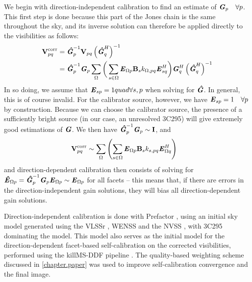 \pg
We begin with direction-independent calibration to find an estimate of $\textbf{\emph{G}}_p\quad\forall p$. This first step is done because this part of the Jones chain is the same throughout the sky, and its inverse solution can therefore be applied directly to the visibilities as follows:
\begin{align}
\textbf{V}_{pq}^\mathrm{corr} &= \textbf{\emph{\^{G}}}_p^{-1} \textbf{V}_{pq} \left( \textbf{\emph{\^{G}}}_q^H \right)^{-1}\\
						&= \textbf{\emph{\^{G}}}_p^{-1}\textbf{\emph{G}}_p \sum_{\Omega}\bigg( \sum_{s\in\Omega} \textbf{\emph{E}}_{\Omega p} \textbf{B}_{s} k_{\Omega,pq} \textbf{\emph{E}}_{sq}^H \bigg) \textbf{\emph{G}}_q^H \left( \textbf{\emph{\^{G}}}_q^H \right)^{-1}
\end{align}
In so doing, we assume that $\textbf{\emph{E}}_{sp}=1quad \forall s,p$ when solving for $\textbf{\emph{\^{G}}}$. In general, this is of course invalid. For the calibrator source, however, we have $\textbf{\emph{E}}_{sp} =1 \quad\forall p$ by construction. Because we can choose the calibrator source, the presence of a sufficiently bright source (in our case, an unresolved 3C295) will give extremely good estimations of $\textbf{\emph{G}}$. We then have $\textbf{\emph{\^{G}}}_p^{-1}\textbf{\emph{G}}_p\sim \bm{\mathrm{I}}$, and
\begin{align}
\textbf{V}_{pq}^\mathrm{corr} &\sim \sum_{\Omega}\left( \sum_{s\in\Omega} \textbf{\emph{E}}_{\Omega p} \textbf{B}_{s} k_{s,pq} \textbf{\emph{E}}_{\Omega q}^H \right)\label{eq.vcorr}
\end{align}
and direction-dependent calibration then consists of solving for $\textbf{\emph{\^{E}}}_{\Omega p} = \textbf{\emph{\^{G}}}_p^{-1}\textbf{\emph{G}}_p\textbf{\emph{E}}_{\Omega p} \sim \textbf{\emph{E}}_{\Omega p}$ for all facets -- this means that, if there are errors in the direction-independent gain solutions, they will bias all direction-dependent gain solutions.

\pg
Direction-independent calibration is done with Prefactor , using an initial sky model generated using the VLSSr , WENSS  and the NVSS , with 3C295 dominating the model. This model also serves as the initial model for the direction-dependent facet-based self-calibration on the corrected visibilities, performed using the killMS-DDF pipeline . The quality-based weighting scheme discussed in \cref{chapter.paper} was used to improve self-calibration convergence and the final image.

